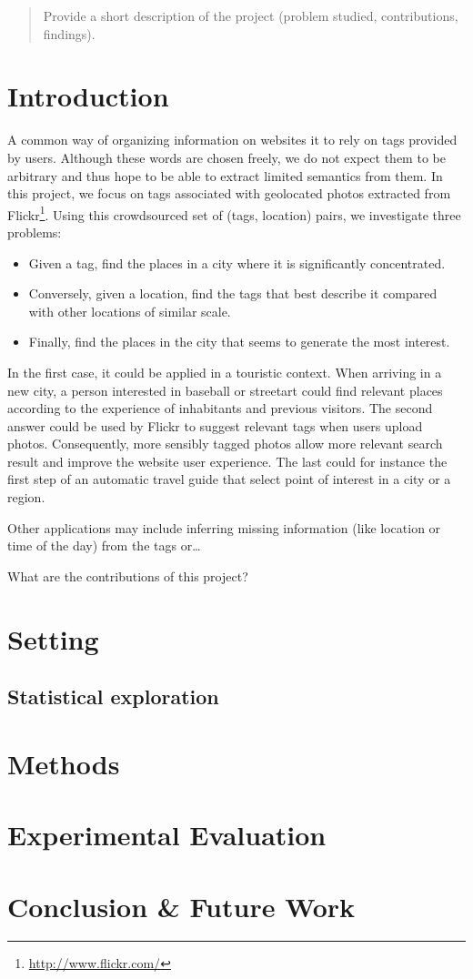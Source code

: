 \begin{abstract}
Provide a short description of the project (problem studied, contributions, findings).
\end{abstract}

\section{Introduction}

A common way of organizing information on websites it to rely on tags provided
by users. Although these words are chosen freely, we do not expect them to be
arbitrary and thus hope to be able to extract limited semantics from them. In
this project, we focus on tags associated with geolocated photos extracted
from
Flickr\footnote{\href{https://secure.flickr.com/}{http://www.flickr.com/}}.
Using this crowdsourced set of (tags, location) pairs, we investigate three
problems:
\begin{itemize}
	\item Given a tag, find the places in a city where it is significantly
		concentrated.
	\item Conversely, given a location, find the tags that best describe it
		compared with other locations of similar scale.
	\item Finally, find the places in the city that seems to generate the
		most interest.
\end{itemize}

In the first case, it could be applied in a touristic context. When arriving in a
new city, a person interested in \textsf{baseball} or \textsf{streetart} could
find relevant places according to the experience of inhabitants and previous
visitors. The second answer could be used by Flickr to suggest relevant tags
when users upload photos. Consequently, more sensibly tagged photos allow more
relevant search result and improve the website user experience. The last could
for instance the first step of an automatic travel guide that select point of
interest in a city or a region.

Other applications may include inferring missing information (like location or
time of the day) from the tags or…

What are the contributions of this project?

\section{Setting}


\subsection{Statistical exploration}

\clearpage

\section{Methods}


\section{Experimental Evaluation}


\section{Conclusion \& Future Work}

